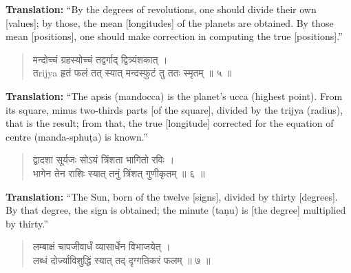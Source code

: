 \documentclass[11pt,a4paper]{article}
\newcommand{\dev}[1]{{\devanagarifont #1}}
\newenvironment{sanskritverse}{\begin{verse}\devanagarifont\large\centering}{\end{verse}}
\begin{document}
\vspace{0.3cm}
\noindent\textbf{Translation:} ``By the degrees of revolutions, one should divide their own [values]; by those, the mean [longitudes] of the planets are obtained. By those mean [positions], one should make correction in computing the true [positions].''

\vspace{0.5cm}

\begin{tcolorbox}[colback=white,colframe=rulecolor,title={\dev{\textbf{कालक्रिया ५ — मन्दफलम् (Equation of Centre)}}}]
\begin{sanskritverse}
\dev{मन्दोच्चं ग्रहस्योच्चं तद्वर्गाद् द्वित्र्यंशकात् ।\\
तrijya हृतं फलं तत् स्यात् मन्दस्फुटं तु ततः स्मृतम् ॥ ५ ॥}
\end{sanskritverse}
\end{tcolorbox}

\vspace{0.3cm}
\noindent\textbf{Translation:} ``The apsis (mandocca) is the planet's ucca (highest point). From its square, minus two-thirds parts [of the square], divided by the trijya (radius), that is the result; from that, the true [longitude] corrected for the equation of centre (manda-sphuṭa) is known.''

\vspace{0.5cm}

\begin{tcolorbox}[colback=white,colframe=rulecolor,title={\dev{\textbf{कालक्रिया ६ — राशिगतिः (Motion through Signs)}}}]
\begin{sanskritverse}
\dev{द्वादशा सूर्यजः सोऽयं त्रिंशता भागितो रविः ।\\
भागेन तेन राशिः स्यात् तनुं त्रिंशत् गुणीकृतम् ॥ ६ ॥}
\end{sanskritverse}
\end{tcolorbox}

\vspace{0.3cm}
\noindent\textbf{Translation:} ``The Sun, born of the twelve [signs], divided by thirty [degrees]. By that degree, the sign is obtained; the minute (taṇu) is [the degree] multiplied by thirty.''

\vspace{0.5cm}

\begin{tcolorbox}[colback=white,colframe=rulecolor,title={\dev{\textbf{कालक्रिया ७ — अयनदृग्गतिः (Precession)}}}]
\begin{sanskritverse}
\dev{लम्बाक्षं चापजीवार्धं व्यासार्धेन विभाजयेत् ।\\
लब्धं दोर्ज्याविशुद्धिं स्यात् तद् दृग्गतिकरं फलम् ॥ ७ ॥}
\end{sanskritverse}
\end{tcolorbox}
\end{document}
